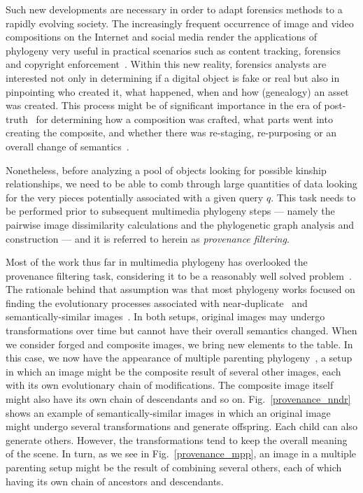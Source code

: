 Such new developments are necessary in order to adapt forensics methods to a rapidly evolving society. The increasingly frequent occurrence of image and video compositions on the Internet and social media render the applications of phylogeny very useful in practical scenarios such as content tracking, forensics and copyright enforcement~\cite{Dias_2012,Dias_2013}. Within this new reality, forensics analysts are interested not only in determining if a digital object is fake or real but also in pinpointing who created it, what happened, when and how (genealogy) an asset was created. This process might be of significant importance in the era of post-truth~\cite{Keyes_2004,Mahler_2016,Schulten_2017} for determining how a composition was crafted, what parts went into creating the composite, and whether there was re-staging, re-purposing or an overall change of semantics~\cite{Rocha:CSUR:2011}. 

Nonetheless, before analyzing a pool of objects looking for possible kinship relationships, we need to be able to comb through large quantities of data looking for the very pieces potentially associated with a given query $q$. This task needs to be performed prior to subsequent multimedia phylogeny steps --- namely the pairwise image dissimilarity calculations and the phylogenetic graph analysis and construction --- and it is referred to herein as \emph{provenance filtering}. 

Most of the work thus far in multimedia phylogeny has overlooked the provenance filtering task, considering it to be a reasonably well solved problem~\cite{Dias_2012,Dias_2013}. The rationale behind that assumption was that most phylogeny works focused on finding the evolutionary processes associated with near-duplicate~\cite{Dias_2012} and semantically-similar images~\cite{Dias_2013}. In both setups, original images may undergo transformations over time but cannot have their overall semantics changed. 
When we consider forged and composite images, we bring new elements to the table. In this case, we now have the appearance of multiple parenting phylogeny~\cite{Oliveira_2016}, a setup in which an image might be the composite result of several other images, each with its own evolutionary chain of modifications. The composite image itself might also have its own chain of descendants and so on. Fig.~\ref{provenance_nndr} shows an example of semantically-similar images in which an original image might undergo several transformations and generate offspring. Each child can also generate others. However, the transformations tend to keep the overall meaning of the scene. In turn, as we see in Fig.~\ref{provenance_mpp}, an image in a multiple parenting setup might be the result of combining several others, each of which having its own chain of ancestors and descendants. 

